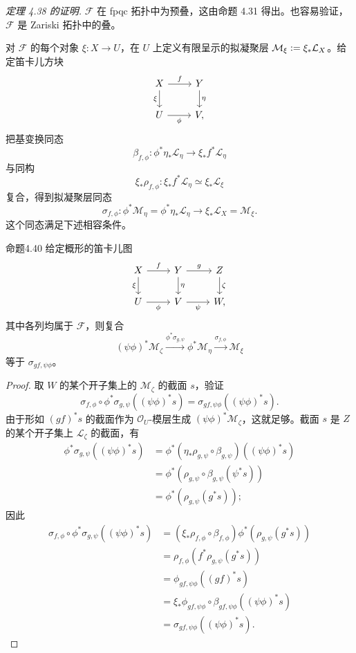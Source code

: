 \noindent\textit{定理 4.38 的证明.}
$\mathcal F$ 在 fpqc 拓扑中为预叠，这由命题 4.31 得出。也容易验证，$\mathcal F$ 是 Zariski 拓扑中的叠。

对 $\mathcal F$ 的每个对象 $\xi\colon X\to U$，在 $U$ 上定义有限呈示的拟凝聚层 $\mathcal M_\xi\mathrel{\mathop:}=\xi_*\mathcal L_X$。给定笛卡儿方块
\[
\begin{tikzcd}
 X\arrow[r,"{f}"]\arrow[d,"{\xi}"']&Y\arrow[d,"{\eta}"]\\
 U\arrow[r,"{\phi}"']&V,
\end{tikzcd}
\]
把基变换同态
\[
 \beta_{f,\phi}\colon\phi^*\eta_*\mathcal L_\eta\longrightarrow\xi_*f^*\mathcal L_\eta
\]
与同构
\[
 \xi_*\rho_{f,\phi}\colon\xi_*f^*\mathcal L_\eta\simeq\xi_*\mathcal L_\xi
\]
复合，得到拟凝聚层同态
\[
 \sigma_{f,\phi}\colon\phi^*\mathcal M_\eta=\phi^*\eta_*\mathcal L_\eta
 \longrightarrow\xi_*\mathcal L_X=\mathcal M_\xi.
\]
这个同态满足下述相容条件。

\begin{origstatement}{命题}{4.40}\label{ch04:prop440}
给定概形的笛卡儿图
\[
\begin{tikzcd}
 X\arrow[r,"{f}"]\arrow[d,"{\xi}"']&Y\arrow[r,"{g}"]\arrow[d,"{\eta}"]&Z\arrow[d,"{\zeta}"]\\
 U\arrow[r,"{\phi}"']&V\arrow[r,"{\psi}"']&W,
\end{tikzcd}
\]
其中各列均属于 $\mathcal F$，则复合
\[
 (\psi\phi)^*\mathcal M_\zeta\xrightarrow{\phi^*\sigma_{g,\psi}}
 \phi^*\mathcal M_\eta\xrightarrow{\sigma_{f,\phi}}\mathcal M_\xi
\]
等于 $\sigma_{gf,\psi\phi}$。
\end{origstatement}
\begin{proof}
取 $W$ 的某个开子集上的 $\mathcal M_\zeta$ 的截面 $s$，验证
\[
 \sigma_{f,\phi}\circ\phi^*\sigma_{g,\psi}((\psi\phi)^*s)
 =\sigma_{gf,\psi\phi}((\psi\phi)^*s).
\]
由于形如 $(gf)^*s$ 的截面作为 $\mathcal O_U$-模层生成 $(\psi\phi)^*\mathcal M_\zeta$，这就足够。截面 $s$ 是 $Z$ 的某个开子集上 $\mathcal L_\zeta$ 的截面，有
\[
\begin{aligned}
 \phi^*\sigma_{g,\psi}((\psi\phi)^*s)
 &=\phi^*(\eta_*\rho_{g,\psi}\circ\beta_{g,\psi})((\psi\phi)^*s)\\
 &=\phi^*(\rho_{g,\psi}\circ\beta_{g,\psi}(\psi^*s))\\
 &=\phi^*(\rho_{g,\psi}(g^*s));
\end{aligned}
\]
因此
\[
\begin{aligned}
 \sigma_{f,\phi}\circ\phi^*\sigma_{g,\psi}((\psi\phi)^*s)
 &=(\xi_*\rho_{f,\phi}\circ\beta_{f,\phi})\phi^*(\rho_{g,\psi}(g^*s))\\
 &=\rho_{f,\phi}(f^*\rho_{g,\psi}(g^*s))\\
 &=\phi_{gf,\psi\phi}((gf)^*s)\\
 &=\xi_*\phi_{gf,\psi\phi}\circ\beta_{gf,\psi\phi}((\psi\phi)^*s)\\
 &=\sigma_{gf,\psi\phi}((\psi\phi)^*s).
\end{aligned}
\]
\end{proof}

